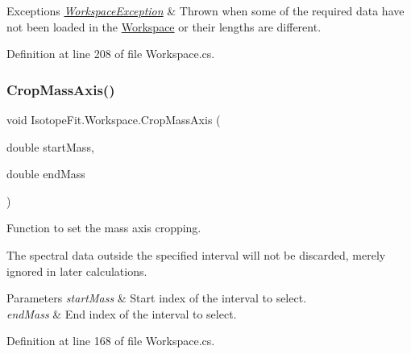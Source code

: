\begin{DoxyExceptions}{Exceptions}
{\em \hyperlink{class_isotope_fit_1_1_workspace_exception}{Workspace\+Exception}} & Thrown when some of the required data have not been loaded in the \hyperlink{class_isotope_fit_1_1_workspace}{Workspace} or their lengths are different.\\
\hline
\end{DoxyExceptions}


Definition at line 208 of file Workspace.\+cs.

\mbox{\label{class_isotope_fit_1_1_workspace_a9c1e21aff90947ff3414ac9d90472452}} 
\subsubsection{\texorpdfstring{Crop\+Mass\+Axis()}{CropMassAxis()}}
{\footnotesize\ttfamily void Isotope\+Fit.\+Workspace.\+Crop\+Mass\+Axis (\begin{DoxyParamCaption}\item[{double}]{start\+Mass,  }\item[{double}]{end\+Mass }\end{DoxyParamCaption})}



Function to set the mass axis cropping. 

The spectral data outside the specified interval will not be discarded, merely ignored in later calculations.


\begin{DoxyParams}{Parameters}
{\em start\+Mass} & Start index of the interval to select.\\
\hline
{\em end\+Mass} & End index of the interval to select.\\
\hline
\end{DoxyParams}


Definition at line 168 of file Workspace.\+cs.

\mbox{\label{class_isotope_fit_1_1_workspace_a40fa9b2c0b5d31feae1093d08b1aad52}} 
